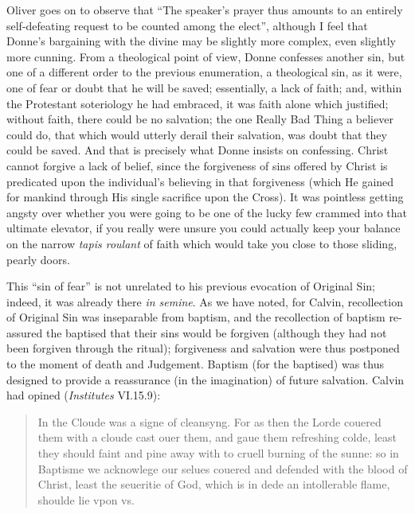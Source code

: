 \begin{paper}
\noindent Oliver goes on to observe that ``The speaker's prayer thus amounts to an
entirely self-defeating request to be counted among the elect'',
although I feel that Donne's bargaining with the divine may be slightly
more complex, even slightly more cunning. From a theological point of
view, Donne confesses another sin, but one of a different order to the
previous enumeration, a theological sin, as it were, one of fear or
doubt that he will be saved; essentially, a lack of faith; and, within
the Protestant soteriology he had embraced, it was faith alone which
justified; without faith, there could be no salvation; the one Really
Bad Thing a believer could do, that which would utterly derail their
salvation, was doubt that they could be saved. And that is precisely
what Donne insists on confessing. Christ cannot forgive a lack of
belief, since the forgiveness of sins offered by Christ is predicated
upon the individual's believing in that forgiveness (which He gained for
mankind through His single sacrifice upon the Cross). It was pointless
getting angsty over whether you were going to be one of the lucky few
crammed into that ultimate elevator, if you really were unsure you could
actually keep your balance on the narrow \emph{tapis roulant} of faith
which would take you close to those sliding, pearly doors.

This ``sin of fear'' is not unrelated to his previous evocation of
Original Sin; indeed, it was already there \emph{in semine}. As we have
noted, for Calvin, recollection of Original Sin was inseparable from
baptism, and the recollection of baptism re-assured the baptised that
their sins would be forgiven (although they had not been forgiven
through the ritual); forgiveness and salvation were thus postponed to
the moment of death and Judgement. Baptism (for the baptised) was thus
designed to provide a reassurance (in the imagination) of future
salvation. Calvin had opined (\emph{Institutes} VI.15.9):

\begin{quote}
In the Cloude was a signe of cleansyng. For as then the Lorde couered
them with a cloude cast ouer them, and gaue them refreshing colde, least
they should faint and pine away with to cruell burning of the sunne: so
in Baptisme we acknowlege our selues couered and defended with the blood
of Christ, least the seueritie of God, which is in dede an intollerable
flame, shoulde lie vpon vs. 
\begin{flushright}
\citep[102r]{calvin_institution_1561}
\end{flushright}
\end{quote}


\end{paper}
